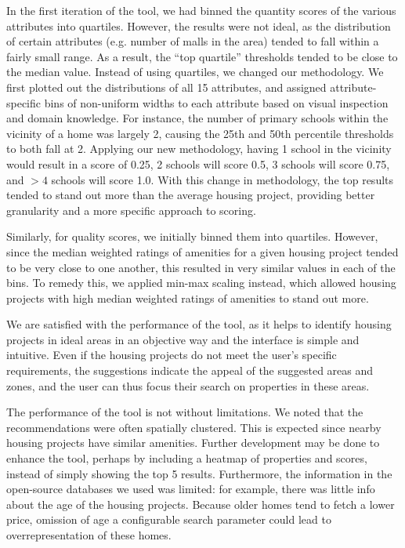 \documentclass[a4paper, 11pt]{article}
\begin{document}
In the first iteration of the tool, we had binned the quantity scores of the various attributes into quartiles. However, the results were not ideal, as the distribution of certain attributes (e.g. number of malls in the area) tended to fall within a fairly small range. As a result, the “top quartile” thresholds tended to be close to the median value. Instead of using quartiles, we changed our methodology. We first plotted out the distributions of all 15 attributes, and assigned attribute-specific bins of non-uniform widths to each attribute based on visual inspection and domain knowledge. For instance, the number of primary schools within the vicinity of a home was largely 2, causing the 25th and 50th percentile thresholds to both fall at 2. Applying our new methodology, having 1 school in the vicinity would result in a score of 0.25, 2 schools will score 0.5, 3 schools will score 0.75, and $>4$ schools will score 1.0. With this change in methodology, the top results tended to stand out more than the average housing project, providing better granularity and a more specific approach to scoring.

Similarly, for quality scores, we initially binned them into quartiles. However, since the median weighted ratings of amenities for a given housing project tended to be very close to one another, this resulted in very similar values in each of the bins. To remedy this, we applied min-max scaling instead, which allowed housing projects with high median weighted ratings of amenities to stand out more.

We are satisfied with the performance of the tool, as it helps to identify housing projects in ideal areas in an objective way and the interface is simple and intuitive. Even if the housing projects do not meet the user’s specific requirements, the suggestions indicate the appeal of the suggested areas and zones, and the user can thus focus their search on properties in these areas. 

The performance of the tool is not without limitations. We noted that the recommendations were often spatially clustered. This is expected since nearby housing projects have similar amenities. Further development may be done to enhance the tool, perhaps by including a heatmap of properties and scores, instead of simply showing the top 5 results. Furthermore, the information in the open-source databases we used was limited: for example, there was little info about the age of the housing projects. Because older homes tend to fetch a lower price, omission of age a configurable search parameter could lead to overrepresentation of these homes.
\end{document}

